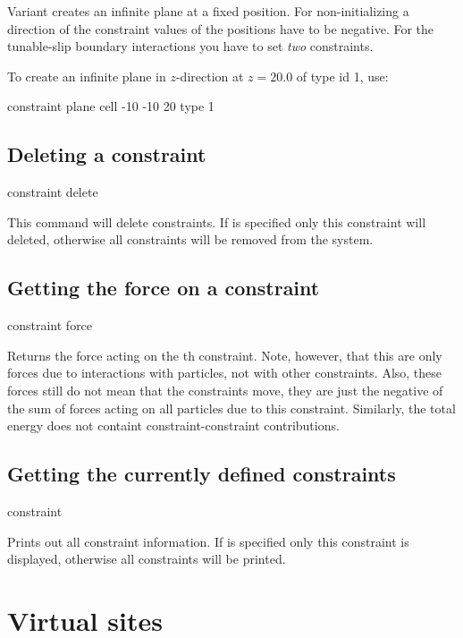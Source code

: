 Variant  creates an infinite plane at a fixed position. For
non-initializing a direction of the constraint values of the positions
have to be negative. For the tunable-slip boundary interactions you
have to set \emph{two} constraints.

To create an infinite plane in $z$-direction at $z=20.0$ of type id 1,
use:
\begin{code}
  constraint plane cell -10 -10 20 type 1
\end{code}

\subsection{Deleting a constraint}
\begin{essyntax}
  constraint delete  
\end{essyntax}

This command will delete constraints. If  is specified only this
constraint will deleted, otherwise all constraints will be removed from the
system. 

\subsection{Getting the force on a constraint}
\begin{essyntax}
constraint force  
\end{essyntax}
Returns the force acting on the th constraint. Note, however, that this
are only forces due to interactions with particles, not with other constraints.
Also, these forces still do not mean that the constraints move, they are just
the negative of the sum of forces acting on all particles due to this constraint.
Similarly, the total energy does not containt constraint-constraint contributions.


\subsection{Getting the currently defined constraints}
\begin{essyntax}
constraint   
\end{essyntax}
Prints out all constraint information. If  is specified only this
constraint is displayed, otherwise all constraints will be printed.

\section{Virtual sites}
\label{sec:virtual}

